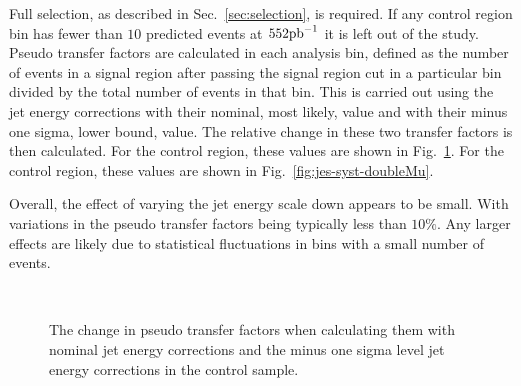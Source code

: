 Full selection, as described in Sec.~\ref{sec:selection}, is required.
If any control region bin has fewer
than $10$ predicted events at $552\ipb$ it is left out of the study.
Pseudo transfer factors are calculated in each analysis bin, defined
as the number of events in a signal region after passing the signal
region \alphat cut in a particular bin divided by the total number of
events in that bin. This is carried out using the jet energy
corrections with their nominal, most likely, value and with their
minus one sigma, lower bound, value. The relative change in these two
transfer factors is then calculated. For the \mj control region, these
values are shown in Fig.~\ref{fig:jes-syst-singleMu}. For the \mmj
control region, these values are shown in
Fig.~\ref{fig:jes-syst-doubleMu}. 

Overall, the effect of varying the jet energy scale down appears to be
small. With variations in the pseudo transfer factors being typically
less than $10\%$. Any larger effects are likely due to statistical
fluctuations in bins with a small number of events.


\begin{figure}[]
  \centering
   ~~
  \caption{\label{fig:jes-syst-singleMu} The change in pseudo transfer
  factors when calculating them with nominal jet energy corrections
  and the minus one sigma level jet energy corrections in the \mj
  control sample.}
\end{figure}

